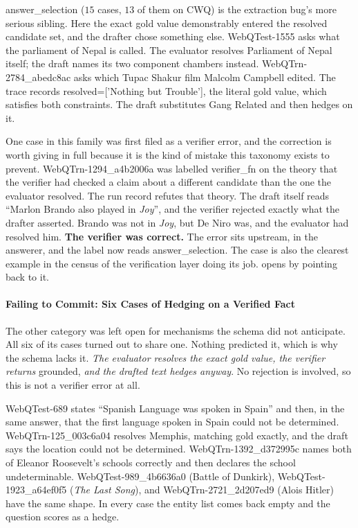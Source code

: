 \textsf{answer\_selection} ($15$ cases, $13$ of them on CWQ) is the extraction
bug's more serious sibling. Here the exact gold value demonstrably entered the
resolved candidate set, and the drafter chose something else.
\textsf{WebQTest-1555} asks what the parliament of Nepal is called. The
evaluator resolves \textsf{Parliament of Nepal} itself; the draft names its two
component chambers instead. \textsf{WebQTrn-2784\_abedc8ac} asks which Tupac
Shakur film Malcolm Campbell edited. The trace records
\textsf{resolved=['Nothing but Trouble']}, the literal gold value, which
satisfies both constraints. The draft substitutes \textsf{Gang Related} and then
hedges on it.

One case in this family was first filed as a verifier error, and the correction
is worth giving in full because it is the kind of mistake this taxonomy exists
to prevent. \textsf{WebQTrn-1294\_a4b2006a} was labelled \textsf{verifier\_fn}
on the theory that the verifier had checked a claim about a different candidate
than the one the evaluator resolved. The run record refutes that theory. The
draft itself reads ``Marlon Brando also played in \emph{Joy}'', and the verifier
rejected exactly what the drafter asserted. Brando was not in \emph{Joy}, but De
Niro was, and the evaluator had resolved him. \textbf{The verifier was correct.}
The error sits upstream, in the answerer, and the label now reads
\textsf{answer\_selection}. The case is also the clearest example in the census
of the verification layer doing its job.  opens by
pointing back to it.

\paragraph{Failing to Commit: Six Cases of Hedging on a Verified Fact}

The \textsf{other} category was left open for mechanisms the schema did
not anticipate. All six of its cases turned out to share one.
Nothing predicted it, which is why the schema lacks it. \emph{The evaluator
resolves the exact gold value, the verifier returns} \textsf{grounded},
\emph{and the drafted text hedges anyway}. No rejection is involved, so this is
not a verifier error at all.

\textsf{WebQTest-689} states ``Spanish Language was spoken in Spain'' and then,
in the same answer, that the first language spoken in Spain could not be
determined. \textsf{WebQTrn-125\_003c6a04} resolves \textsf{Memphis}, matching
gold exactly, and the draft says the location could not be determined.
\textsf{WebQTrn-1392\_d372995c} names both of Eleanor Roosevelt's schools
correctly and then declares the school undeterminable.
\textsf{WebQTest-989\_4b6636a0} (Battle of Dunkirk),
\textsf{WebQTest-1923\_a64ef0f5} (\emph{The Last Song}), and
\textsf{WebQTrn-2721\_2d207ed9} (\textsf{Alois Hitler}) have the same shape. In
every case the entity list comes back empty and the question scores as a hedge.

